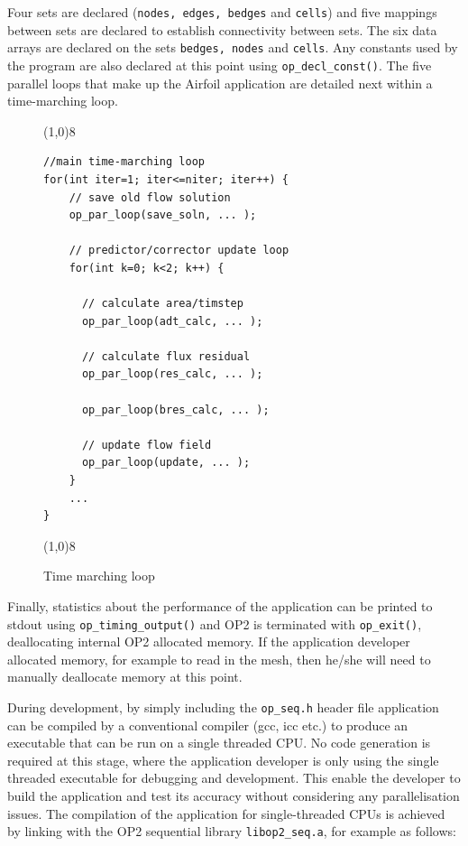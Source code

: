 \documentclass[11pt]{article}
\begin{document}
\noindent Four sets are declared (\texttt{nodes, edges, bedges} and \texttt{cells}) and five mappings between sets are
declared to establish connectivity between sets. The six data arrays are declared on the sets \texttt{bedges, nodes} and
\texttt{cells}. Any constants used by the program are also declared at this point using \texttt{op\_decl\_const()}.
The five parallel loops that make up the Airfoil application are detailed next within a time-marching loop.
\begin{figure}[!h]\small
\vspace{-0pt}\noindent\line(1,0){8}\vspace{-10pt}
\begin{lstlisting}
//main time-marching loop
for(int iter=1; iter<=niter; iter++) {
    // save old flow solution
    op_par_loop(save_soln, ... );

    // predictor/corrector update loop
    for(int k=0; k<2; k++) {

      // calculate area/timstep
      op_par_loop(adt_calc, ... );

      // calculate flux residual
      op_par_loop(res_calc, ... );

      op_par_loop(bres_calc, ... );
      
      // update flow field
      op_par_loop(update, ... );
    }
    ...
}
\end{lstlisting}\vspace{-10pt}
\vspace{-0pt}\noindent\line(1,0){8}\vspace{-10pt}
\caption{\small Time marching loop }
\normalsize\vspace{-10pt}\label{fig:timemarching}
\end{figure}

Finally, statistics about the performance of the application can be printed to stdout using
\texttt{op\_timing\_output()} and OP2 is terminated with \texttt{op\_exit()}, deallocating internal OP2 allocated
memory. If the application developer allocated memory, for example to read in the mesh, then he/she will need to
manually deallocate memory at this point. 

During development, by simply including the \texttt{op\_seq.h} header file application can be compiled by a conventional
compiler (gcc, icc etc.) to produce an executable that can be run on a single threaded CPU. No code generation is
required at this stage, where the application developer is only using the single threaded executable for debugging and
development. This enable the developer to build the application and test its accuracy without considering any
parallelisation issues. The compilation of the application for single-threaded CPUs is achieved by linking with the OP2
sequential library \texttt{libop2\_seq.a}, for example as follows:
\end{document}
